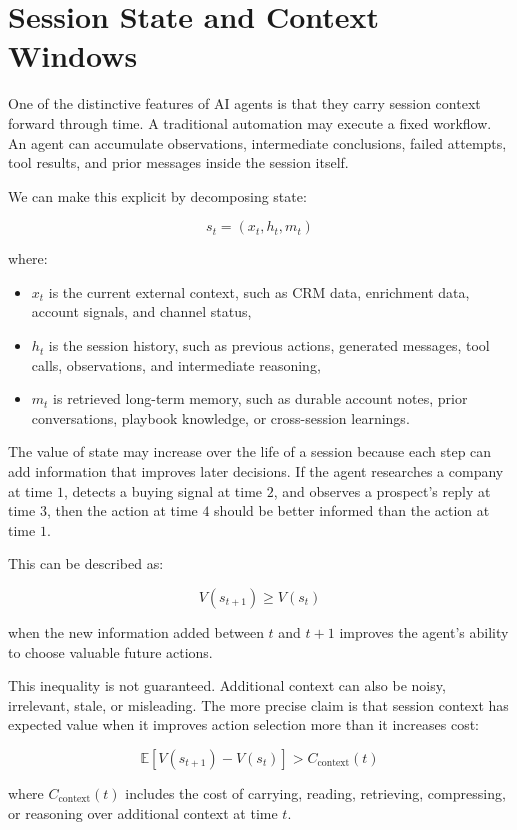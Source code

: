 \documentclass[12pt]{article}
\begin{document}
\section{Session State and Context Windows}

One of the distinctive features of AI agents is that they carry session context
forward through time. A traditional automation may execute a fixed workflow. An
agent can accumulate observations, intermediate conclusions, failed attempts,
tool results, and prior messages inside the session itself.

We can make this explicit by decomposing state:

\[
s_t = (x_t, h_t, m_t)
\]

where:

\begin{itemize}
    \item \(x_t\) is the current external context, such as CRM data, enrichment
    data, account signals, and channel status,
    \item \(h_t\) is the session history, such as previous actions, generated
    messages, tool calls, observations, and intermediate reasoning,
    \item \(m_t\) is retrieved long-term memory, such as durable account notes,
    prior conversations, playbook knowledge, or cross-session learnings.
\end{itemize}

The value of state may increase over the life of a session because each step can
add information that improves later decisions. If the agent researches a company
at time \(1\), detects a buying signal at time \(2\), and observes a prospect's
reply at time \(3\), then the action at time \(4\) should be better informed than
the action at time \(1\).

This can be described as:

\[
V(s_{t+1}) \geq V(s_t)
\]

when the new information added between \(t\) and \(t+1\) improves the agent's
ability to choose valuable future actions.

This inequality is not guaranteed. Additional context can also be noisy,
irrelevant, stale, or misleading. The more precise claim is that session context
has expected value when it improves action selection more than it increases
cost:

\[
\mathbb{E}[V(s_{t+1}) - V(s_t)] > C_{\text{context}}(t)
\]

where \(C_{\text{context}}(t)\) includes the cost of carrying, reading,
retrieving, compressing, or reasoning over additional context at time \(t\).
\end{document}
